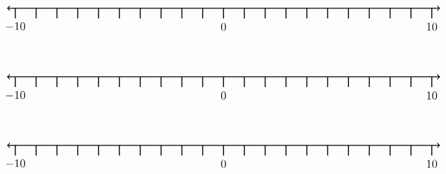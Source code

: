 \documentclass[leqno, 12pt]{article}
\begin{document}
\vspace{10pt}\begin{equation}
    \begin{tikzpicture}[scale=0.75, baseline={([yshift=-1pt]current bounding box.north)}]
        \draw[{To[scale=1.3]}-{To[scale=1.3]}, line width=1pt] (-10.4, 0) -- (10.4, 0);
        \foreach \x in {-10,-9,...,10}
            \draw[shift={(\x,0)},color=black, line width=1pt] (0pt,-14pt) -- (0pt,0pt);
        \foreach \x in {-10,0,10}
            \draw[shift={(\x,-0.8)},color=black] node[font=\large,text height=12pt] {$\x$};
        \node [font=\large, minimum width=30mm] at (11.0,1.2) {$  $};
    \end{tikzpicture}
\end{equation}
\vspace{10pt}\begin{equation}
    \begin{tikzpicture}[scale=0.75, baseline={([yshift=-1pt]current bounding box.north)}]
        \draw[{To[scale=1.3]}-{To[scale=1.3]}, line width=1pt] (-10.4, 0) -- (10.4, 0);
        \foreach \x in {-10,-9,...,10}
            \draw[shift={(\x,0)},color=black, line width=1pt] (0pt,-14pt) -- (0pt,0pt);
        \foreach \x in {-10,0,10}
            \draw[shift={(\x,-0.8)},color=black] node[font=\large,text height=12pt] {$\x$};
        \node [font=\large, minimum width=30mm] at (11.0,1.2) {$  $};
    \end{tikzpicture}
\end{equation}
\vspace{10pt}\begin{equation}
    \begin{tikzpicture}[scale=0.75, baseline={([yshift=-1pt]current bounding box.north)}]
        \draw[{To[scale=1.3]}-{To[scale=1.3]}, line width=1pt] (-10.4, 0) -- (10.4, 0);
        \foreach \x in {-10,-9,...,10}
            \draw[shift={(\x,0)},color=black, line width=1pt] (0pt,-14pt) -- (0pt,0pt);
        \foreach \x in {-10,0,10}
            \draw[shift={(\x,-0.8)},color=black] node[font=\large,text height=12pt] {$\x$};
        \node [font=\large, minimum width=30mm] at (11.0,1.2) {$  $};
    \end{tikzpicture}
\end{equation}
\end{document}
